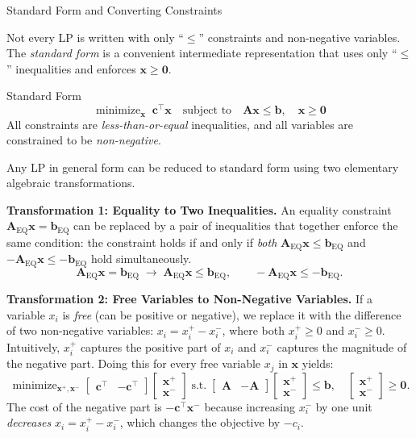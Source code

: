\documentclass[aspectratio=169,10pt]{beamer}
\DeclareMathOperator*{\minimize}{minimize}
\newcommand{\xv}{\mathbf{x}}
\newcommand{\cv}{\mathbf{c}}
\newcommand{\bv}{\mathbf{b}}
\newcommand{\Av}{\mathbf{A}}
\begin{document}
\begin{frame}[allowframebreaks]{Standard Form and Converting Constraints}

Not every LP is written with only ``$\le$'' constraints and non-negative variables.
The \emph{standard form} is a convenient intermediate representation that uses only
``$\le$'' inequalities and enforces $\xv \ge \mathbf{0}$.

\begin{block}{Standard Form}
\[
  \minimize_{\xv}\;\cv^\top\xv
  \quad\text{subject to}\quad
  \Av\xv \le \bv,\quad \xv \ge \mathbf{0}
\]
All constraints are \emph{less-than-or-equal} inequalities, and all variables are
constrained to be \emph{non-negative}.
\end{block}

Any LP in general form can be reduced to standard form using two elementary
algebraic transformations.

\textbf{Transformation 1: Equality to Two Inequalities.}
An equality constraint $\Av_{\mathrm{EQ}}\xv = \bv_{\mathrm{EQ}}$ can be replaced by
a pair of inequalities that together enforce the same condition: the constraint holds
if and only if \emph{both} $\Av_{\mathrm{EQ}}\xv \le \bv_{\mathrm{EQ}}$ and
$-\Av_{\mathrm{EQ}}\xv \le -\bv_{\mathrm{EQ}}$ hold simultaneously.
\[
  \Av_{\mathrm{EQ}}\xv = \bv_{\mathrm{EQ}}
  \;\longrightarrow\;
  \Av_{\mathrm{EQ}}\xv \le \bv_{\mathrm{EQ}},\qquad
  -\Av_{\mathrm{EQ}}\xv \le -\bv_{\mathrm{EQ}}.
\]

\textbf{Transformation 2: Free Variables to Non-Negative Variables.}
If a variable $x_i$ is \emph{free} (can be positive or negative), we replace it with
the difference of two non-negative variables: $x_i = x_i^+ - x_i^-$, where both
$x_i^+ \ge 0$ and $x_i^- \ge 0$.  Intuitively, $x_i^+$ captures the positive part
of $x_i$ and $x_i^-$ captures the magnitude of the negative part.  Doing this for
every free variable $x_j$ in $\xv$ yields:
\[
  \minimize_{\xv^+,\xv^-}
  \begin{bmatrix}\cv^\top & -\cv^\top\end{bmatrix}
  \begin{bmatrix}\xv^+\\\xv^-\end{bmatrix}
  \;\text{s.t.}\;
  \begin{bmatrix}\Av & -\Av\end{bmatrix}
  \begin{bmatrix}\xv^+\\\xv^-\end{bmatrix}
  \le \bv,\quad
  \begin{bmatrix}\xv^+\\\xv^-\end{bmatrix}\ge\mathbf{0}.
\]
The cost of the negative part is $-\cv^\top\xv^-$ because increasing $x_i^-$ by one
unit \emph{decreases} $x_i = x_i^+ - x_i^-$, which changes the objective by $-c_i$.


\end{frame}
\end{document}
